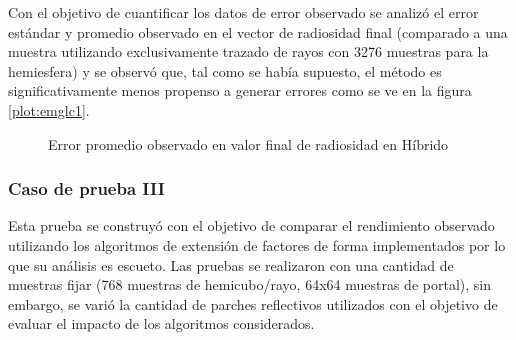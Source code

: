 Con el objetivo de cuantificar los datos de error observado se analizó el error estándar y promedio observado en el vector de radiosidad final (comparado a una muestra utilizando exclusivamente trazado de rayos con 3276 muestras para la hemiesfera) y se observó que, tal como se había supuesto, el método es significativamente menos propenso a generar errores como se ve en la figura \ref{plot:emglc1}.

\begin{figure}
\caption{Error promedio observado en valor final de radiosidad en Híbrido}
\label{plot:errorcII}
\end{figure}
\subsubsection{Caso de prueba III}

Esta prueba se construyó con el objetivo de comparar el rendimiento observado utilizando los algoritmos de extensión de factores de forma implementados por lo que su análisis es escueto. Las pruebas se realizaron con una cantidad de muestras fijar (768 muestras de hemicubo/rayo, 64x64 muestras de portal), sin embargo, se varió la cantidad de parches reflectivos utilizados con el objetivo de evaluar el impacto de los algoritmos considerados.

